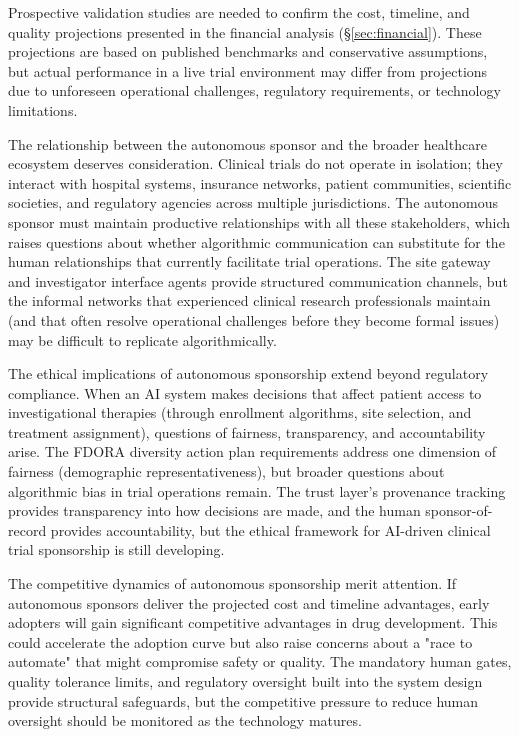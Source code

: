 Prospective validation studies are needed to confirm the cost, timeline, and quality
projections presented in the financial analysis (\S\ref{sec:financial}). These projections
are based on published benchmarks and conservative assumptions, but actual performance in
a live trial environment may differ from projections due to unforeseen operational
challenges, regulatory requirements, or technology limitations.

The relationship between the autonomous sponsor and the broader healthcare ecosystem
deserves consideration. Clinical trials do not operate in isolation; they interact with
hospital systems, insurance networks, patient communities, scientific societies, and
regulatory agencies across multiple jurisdictions. The autonomous sponsor must maintain
productive relationships with all these stakeholders, which raises questions about
whether algorithmic communication can substitute for the human relationships that
currently facilitate trial operations. The site gateway and investigator interface
agents provide structured communication channels, but the informal networks that
experienced clinical research professionals maintain (and that often resolve operational
challenges before they become formal issues) may be difficult to replicate algorithmically.

The ethical implications of autonomous sponsorship extend beyond regulatory compliance.
When an AI system makes decisions that affect patient access to investigational therapies
(through enrollment algorithms, site selection, and treatment assignment), questions of
fairness, transparency, and accountability arise. The FDORA diversity action plan
requirements \cite{fdora} address one dimension of fairness (demographic
representativeness), but broader questions about algorithmic bias in trial operations
remain. The trust layer's provenance tracking provides transparency into how decisions
are made, and the human sponsor-of-record provides accountability, but the ethical
framework for AI-driven clinical trial sponsorship is still developing.

The competitive dynamics of autonomous sponsorship merit attention. If autonomous sponsors
deliver the projected cost and timeline advantages, early adopters will gain significant
competitive advantages in drug development. This could accelerate the adoption curve but
also raise concerns about a "race to automate" that might compromise safety or quality.
The mandatory human gates, quality tolerance limits, and regulatory oversight built into
the system design provide structural safeguards, but the competitive pressure to reduce
human oversight should be monitored as the technology matures.

